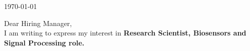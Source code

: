 \documentclass{my_cv}
\begin{document}
\vspace{-2mm}
\begin{center} 
\begin{footnotesize}
\end{footnotesize}

\href{https://www.linkedin.com/in/venkaiahchowdarykavuri}{\faLinkedinSquare} \href{https://github.com/Venki-Kavuri}{\faGithub} \href{https://scholar.google.com/citations?hl=en&user=r5E9ACIAAAAJ&view_op=list_works}{\aiGoogleScholar} \href{https://www.facebook.com/venki.kavuri}{\faFacebookOfficial}
\end{center} 
\vspace{5mm} 
\today\\
\vspace{5mm} 



Dear Hiring Manager,\\
\vspace{2mm} 
I am writing to express my interest in \textbf{Research Scientist, Biosensors and Signal Processing role.}\\
\vspace{2mm} 
\end{document}
